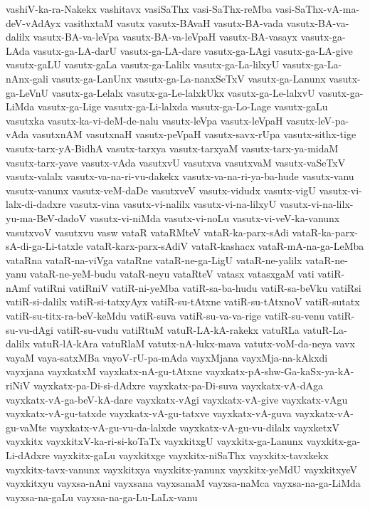 {vashiV-ka-ra-Nakekx
vashitavx
vasiSaThx
vasi-SaThx-reMba
vasi-SaThx-vA-ma-deV-vAdAyx
vasithxtaM
vasutx
vasutx-BAvaH
vasutx-BA-vada
vasutx-BA-va-dalilx
vasutx-BA-va-leVpa
vasutx-BA-va-leVpaH
vasutx-BA-vasayx
vasutx-ga-LAda
vasutx-ga-LA-darU
vasutx-ga-LA-dare
vasutx-ga-LAgi
vasutx-ga-LA-give
vasutx-gaLU
vasutx-gaLa
vasutx-ga-Lalilx
vasutx-ga-La-lilxyU
vasutx-ga-La-nAnx-gali
vasutx-ga-LanUnx
vasutx-ga-La-nanxSeTxV
vasutx-ga-Lanunx
vasutx-ga-LeVnU
vasutx-ga-Lelalx
vasutx-ga-Le-lalxkUkx
vasutx-ga-Le-lalxvU
vasutx-ga-LiMda
vasutx-ga-Lige
vasutx-ga-Li-lalxda
vasutx-ga-Lo-Lage
vasutx-gaLu
vasutxka
vasutx-ka-vi-deM-de-nalu
vasutx-leVpa
vasutx-leVpaH
vasutx-leV-pa-vAda
vasutxnAM
vasutxnaH
vasutx-peVpaH
vasutx-savx-rUpa
vasutx-sithx-tige
vasutx-tarx-yA-BidhA
vasutx-tarxya
vasutx-tarxyaM
vasutx-tarx-ya-midaM
vasutx-tarx-yave
vasutx-vAda
vasutxvU
vasutxva
vasutxvaM
vasutx-vaSeTxV
vasutx-valalx
vasutx-va-na-ri-vu-dakekx
vasutx-va-na-ri-ya-ba-hude
vasutx-vanu
vasutx-vanunx
vasutx-veM-daDe
vasutxveV
vasutx-vidudx
vasutx-vigU
vasutx-vi-lalx-di-dadxre
vasutx-vina
vasutx-vi-nalilx
vasutx-vi-na-lilxyU
vasutx-vi-na-lilx-yu-ma-BeV-dadoV
vasutx-vi-niMda
vasutx-vi-noLu
vasutx-vi-veV-ka-vanunx
vasutxvoV
vasutxvu
vasw
vataR
vataRMteV
vataR-ka-parx-sAdi
vataR-ka-parx-sA-di-ga-Li-tatxle
vataR-karx-parx-sAdiV
vataR-kashacx
vataR-mA-na-ga-LeMba
vataRna
vataR-na-viVga
vataRne
vataR-ne-ga-LigU
vataR-ne-yalilx
vataR-ne-yanu
vataR-ne-yeM-budu
vataR-neyu
vataRteV
vatasx
vatasxgaM
vati
vatiR-nAmf
vatiRni
vatiRniV
vatiR-ni-yeMba
vatiR-sa-ba-hudu
vatiR-sa-beVku
vatiRsi
vatiR-si-dalilx
vatiR-si-tatxyAyx
vatiR-su-tAtxne
vatiR-su-tAtxnoV
vatiR-sutatx
vatiR-su-titx-ra-beV-keMdu
vatiR-suva
vatiR-su-va-va-rige
vatiR-su-venu
vatiR-su-vu-dAgi
vatiR-su-vudu
vatiRtuM
vatuR-LA-kA-rakekx
vatuRLa
vatuR-La-dalilx
vatuR-lA-kAra
vatuRlaM
vatutx-nA-lukx-mava
vatutx-voM-da-neya
vavx
vayaM
vaya-satxMBa
vayoV-rU-pa-mAda
vayxMjana
vayxMja-na-kAkxdi
vayxjana
vayxkatxM
vayxkatx-nA-gu-tAtxne
vayxkatx-pA-shw-Ga-kaSx-ya-kA-riNiV
vayxkatx-pa-Di-si-dAdxre
vayxkatx-pa-Di-suva
vayxkatx-vA-dAga
vayxkatx-vA-ga-beV-kA-dare
vayxkatx-vAgi
vayxkatx-vA-give
vayxkatx-vAgu
vayxkatx-vA-gu-tatxde
vayxkatx-vA-gu-tatxve
vayxkatx-vA-guva
vayxkatx-vA-gu-vaMte
vayxkatx-vA-gu-vu-da-lalxde
vayxkatx-vA-gu-vu-dilalx
vayxketxV
vayxkitx
vayxkitxV-ka-ri-si-koTaTx
vayxkitxgU
vayxkitx-ga-Lanunx
vayxkitx-ga-Li-dAdxre
vayxkitx-gaLu
vayxkitxge
vayxkitx-niSaThx
vayxkitx-tavxkekx
vayxkitx-tavx-vanunx
vayxkitxya
vayxkitx-yanunx
vayxkitx-yeMdU
vayxkitxyeV
vayxkitxyu
vayxsa-nAni
vayxsana
vayxsanaM
vayxsa-naMca
vayxsa-na-ga-LiMda
vayxsa-na-gaLu
vayxsa-na-ga-Lu-LaLx-vanu
}
